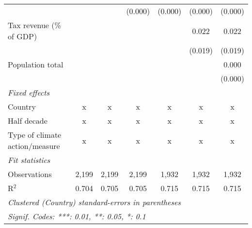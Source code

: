 \begin{tabular}{lcccccc}
                                                                                  &                &                & (0.000)        & (0.000)      & (0.000)      & (0.000)\\   
   Tax revenue (\% of GDP)                                                        &                &                &                &              & 0.022        & 0.022\\   
                                                                                  &                &                &                &              & (0.019)      & (0.019)\\   
   Population total                                                               &                &                &                &              &              & 0.000\\   
                                                                                  &                &                &                &              &              & (0.000)\\   
   \emph{Fixed effects}\\
   Country                                                                        & x              & x              & x              & x            & x            & x\\  
   Half decade                                                                    & x              & x              & x              & x            & x            & x\\  
   Type of climate action/measure                                                 & x              & x              & x              & x            & x            & x\\  
   \midrule \emph{Fit statistics}\\
   Observations                                                                   & 2,199          & 2,199          & 2,199          & 1,932        & 1,932        & 1,932\\  
   R$^2$                                                                          & 0.704          & 0.705          & 0.705          & 0.715        & 0.715        & 0.715\\  
   \midrule
   \multicolumn{7}{l}{\emph{Clustered (Country) standard-errors in parentheses}}\\
   \multicolumn{7}{l}{\emph{Signif. Codes: ***: 0.01, **: 0.05, *: 0.1}}\\
\end{tabular}
\par\endgroup


